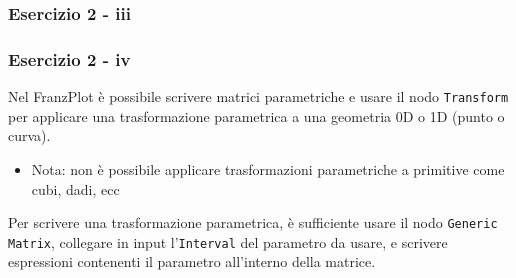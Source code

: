 \documentclass{beamer}
\newcommand{\fig}{figures} %
\newcommand{\frnzplt}{FranzPlot }
\begin{document}
\begin{frame}
\frametitle{Esercizio 2 - iii}
\begin{center}
\end{center}

\end{frame}

\begin{frame}
\frametitle{Esercizio 2 - iv}
    Nel \frnzplt \`e possibile scrivere matrici parametriche e usare il nodo \texttt{Transform} per
    applicare una trasformazione parametrica a una geometria 0D o 1D (punto o curva).

    \begin{itemize}
        \item Nota: non \`e possibile applicare trasformazioni parametriche a primitive come cubi, dadi, ecc
    \end{itemize}

    \vspace{1cm}
    Per scrivere una trasformazione parametrica, \`e sufficiente usare il nodo
    \texttt{Generic Matrix}, collegare in input l'\texttt{Interval} del parametro da usare,
    e scrivere espressioni contenenti il parametro all'interno della matrice.

\end{frame}
\end{document}
